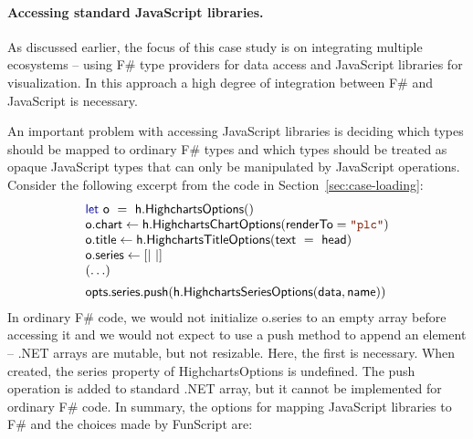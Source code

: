 \documentclass[submission,copyright,creativecommons]{eptcs}
\newcommand{\kvd}[1]{\textnormal{\textcolor{kvdclr}{\sffamily #1}}}
\newcommand{\str}[1]{\textnormal{\textcolor{strclr}{\ttfamily "#1"}}}
\newcommand{\ident}[1]{\textnormal{\sffamily #1}}
\begin{document}
\paragraph{Accessing standard JavaScript libraries.}
As discussed earlier, the focus of this case study is on integrating multiple ecosystems -- using
F\# type providers for data access and JavaScript libraries for visualization. In this approach
a high degree of integration between F\# and JavaScript is necessary.

An important problem with accessing JavaScript libraries is deciding which types should be
mapped to ordinary F\# types and which types should be treated as opaque JavaScript types that
can only be manipulated by JavaScript operations. Consider the following excerpt from the code
in Section~\ref{sec:case-loading}:
%
\begin{equation*}
\begin{array}{lll}
 \kvd{let}~\ident{o}~=~\ident{h.HighchartsOptions}() \\
 \ident{o.chart} \leftarrow \ident{h.HighchartsChartOptions}(\ident{renderTo}=\str{plc}) \\
 \ident{o.title} \leftarrow \ident{h.HighchartsTitleOptions}(\ident{text}~=~\ident{head}) \\
 \ident{o.series} \leftarrow \lbrack| ~ |\rbrack \\
 (\ldots)
 \\[0.5em]
 \ident{opts.series.push}(\ident{h.HighchartsSeriesOptions}(\ident{data}, \ident{name}))
\end{array}
\end{equation*}
%
In ordinary F\# code, we would not initialize \ident{o.series} to an empty array before
accessing it and we would not expect to use a \ident{push} method to append an element --
.NET arrays are mutable, but not resizable. Here, the first is necessary. When created,
the \ident{series} property of \ident{HighchartsOptions} is \kvd{undefined}. The \ident{push}
operation is added to standard .NET array, but it cannot be implemented for ordinary F\# code.
In summary, the options for mapping JavaScript libraries to F\# and the choices made by FunScript
are:
\end{document}
